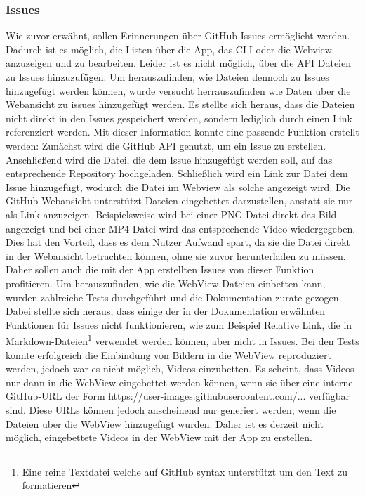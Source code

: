 \subsubsection{Issues}%
Wie zuvor erwähnt, sollen Erinnerungen über GitHub Issues ermöglicht werden. Dadurch ist es möglich, die Listen über die App, das CLI oder die Webview anzuzeigen und zu bearbeiten.%
Leider ist es nicht möglich, über die API Dateien zu Issues hinzuzufügen\cite{imp_github_issueFilesUnsupported}. %
	Um herauszufinden, wie Dateien dennoch zu Issues hinzugefügt werden können, wurde versucht herrauszufinden wie Daten über die Webansicht zu issues hinzugefügt werden. Es stellte sich heraus, dass die Dateien nicht direkt in den Issues gespeichert werden, sondern lediglich durch einen Link referenziert werden. %
	Mit dieser Information konnte eine passende Funktion erstellt werden: Zunächst wird die GitHub API genutzt, um ein Issue zu erstellen. Anschließend wird die Datei, die dem Issue hinzugefügt werden soll, auf das entsprechende Repository hochgeladen. Schließlich wird ein Link zur Datei dem Issue hinzugefügt, wodurch die Datei im Webview als solche angezeigt wird. %
\newline%
Die GitHub-Webansicht unterstützt Dateien eingebettet darzustellen, anstatt sie nur als Link anzuzeigen. Beispielsweise wird bei einer PNG-Datei direkt das Bild angezeigt und bei einer MP4-Datei wird das entsprechende Video wiedergegeben. %
Dies hat den Vorteil, dass es dem Nutzer Aufwand spart, da sie die Datei direkt in der Webansicht betrachten können, ohne sie zuvor herunterladen zu müssen.%
Daher sollen auch die mit der App erstellten Issues von dieser Funktion profitieren. Um herauszufinden, wie die WebView Dateien einbetten kann, wurden zahlreiche Tests durchgeführt und die Dokumentation zurate gezogen\cite{imp_github_syntaxing}. Dabei stellte sich heraus, dass einige der in der Dokumentation erwähnten Funktionen für Issues nicht funktionieren, wie zum Beispiel \glqq Relative Link\grqq{}, die in Markdown-Dateien\footnote{Eine reine Textdatei welche auf GitHub syntax unterstützt um den Text zu formatieren} verwendet werden können, aber nicht in Issues.
Bei den Tests konnte erfolgreich die Einbindung von Bildern in die WebView reproduziert werden, jedoch war es nicht möglich, Videos einzubetten. Es scheint, dass Videos nur dann in die WebView eingebettet werden können, wenn sie über eine interne GitHub-URL der Form \glqq https://user-images.githubusercontent.com/...\grqq{} verfügbar sind. Diese URLs können jedoch anscheinend nur generiert werden, wenn die Dateien über die WebView hinzugefügt wurden. Daher ist es derzeit nicht möglich, eingebettete Videos in der WebView mit der App zu erstellen.%
